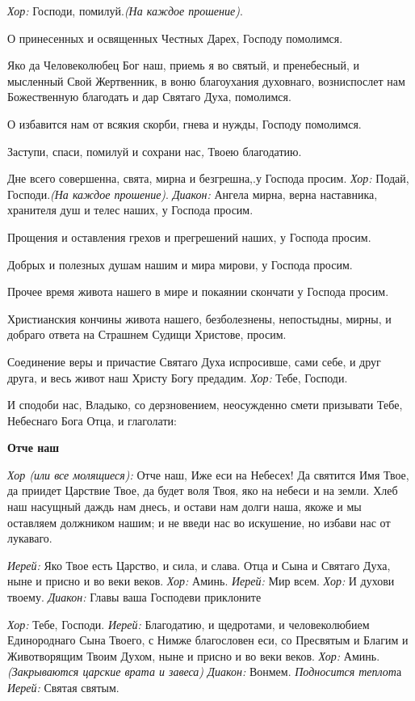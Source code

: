 {\itshape Хор:} Господи, помилуй.{\itshape  (На каждое прошение)}. 

  О принесенных и освященных Честных Дарех, Господу помолимся. 

  Яко да Человеколюбец Бог наш, приемь я во святый, и пренебесный, и мысленный Свой Жертвенник, в воню благоухания духовнаго, возниспослет нам Божественную благодать и дар Святаго Духа, помолимся. 

  О избавится нам от всякия скорби, гнева и нужды, Господу помолимся. 

  Заступи, спаси, помилуй и сохрани нас{\itshape ,} Твоею благодатию. 

  Дне всего совершенна, свята, мирна и безгрешна,.у Господа просим. 
{\itshape 
  Хор:} Подай, Господи.{\itshape  (На каждое прошение)}. 
{\itshape 
  Диакон:} Ангела мирна, верна наставника, хранителя душ и телес наших, у Господа просим. 

  Прощения и оставления грехов и прегрешений наших, у Господа просим. 

  Добрых и полезных душам нашим и мира мирови, у Господа просим. 

  Прочее время живота нашего в мире и покаянии скончати у Господа просим. 

  Христианския кончины живота нашего, безболезнены, непостыдны, мирны, и добраго ответа на Страшнем Судищи Христове, просим. 

  Соединение веры и причастие Святаго Духа испросивше, сами себе, и друг друга, и весь живот наш Христу Богу предадим. 
{\itshape 
  Хор:} Тебе, Господи. 

  И сподоби нас, Владыко, со дерзновением, неосужденно смети призывати Тебе, Небеснаго Бога Отца, и глаголати: 

 {\bfseries  Отче наш }

{\itshape  Хор (или все молящиеся):} Отче наш, Иже еси на Небесех! Да святится Имя Твое, да приидет Царствие Твое, да будет воля Твоя, яко на небеси и на земли. Хлеб наш насущный даждь нам днесь, и остави нам долги наша, якоже и мы оставляем должником нашим; и не введи нас во искушение, но избави нас от лукаваго. 

{\itshape  Иерей:} Яко Твое есть Царство, и сила, и слава. Отца и Сына и Святаго Духа, ныне и присно и во веки веков. 
{\itshape 
  Хор:} Аминь. 
{\itshape 
  Иерей:} Мир всем. 
{\itshape 
  Хор:} И духови твоему. {\itshape  Диакон:} Главы ваша Господеви приклоните

{\itshape Хор:} Тебе, Господи. {\itshape  Иерей:} Благодатию, и щедротами, и человеколюбием Единороднаго Сына Твоего, с Нимже благословен еси, со Пресвятым и Благим и Животворящим Твоим Духом, ныне и присно и во веки веков. 
{\itshape 
  Хор:} Аминь. 
{\itshape  (Закрываются царские врата и завеса)
  Диакон:} Вонмем. 
{\itshape 
  Подносится теплот}а 
{\itshape 
  Иерей:} Святая святым. 

